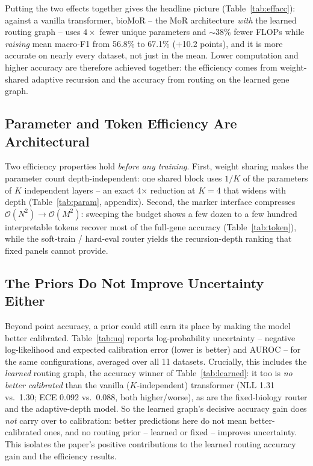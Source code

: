 \documentclass[letterpaper]{article}
\begin{document}
Putting the two effects together gives the headline picture (Table~\ref{tab:effacc}):
against a vanilla transformer, bioMoR -- the MoR architecture \emph{with} the learned
routing graph -- uses $4\times$ fewer unique parameters and
$\sim$38\% fewer FLOPs while \emph{raising} mean macro-F1 from 56.8\% to
67.1\% ($+$10.2 points), and it is more accurate on nearly every dataset,
not just in the mean. Lower computation and higher accuracy are therefore achieved together:
the efficiency comes from weight-shared adaptive recursion and the accuracy from routing on
the learned gene graph.


\subsection{Parameter and Token Efficiency Are Architectural}
\label{sec:params}
Two efficiency properties hold \emph{before any training}. First, weight sharing makes the
parameter count depth-independent: one shared block uses $1/K$ of the parameters of $K$
independent layers -- an exact 4$\times$ reduction at $K{=}$4 that
widens with depth (Table~\ref{tab:param}, appendix). Second, the marker interface compresses
$\mathcal{O}(N^2)\!\to\!\mathcal{O}(M^2)$: sweeping the budget shows a few dozen to a few
hundred interpretable tokens recover most of the full-gene accuracy (Table~\ref{tab:token}),
while the soft-train / hard-eval router yields the recursion-depth ranking that
fixed panels cannot provide.



\subsection{The Priors Do Not Improve Uncertainty Either}
Beyond point accuracy, a prior could still earn its place by making the model better
calibrated. Table~\ref{tab:uq} reports log-probability uncertainty -- negative
log-likelihood and expected calibration error (lower is better) and AUROC -- for the same
configurations, averaged over all 11 datasets. Crucially, this includes the
\emph{learned} routing graph, the accuracy winner of Table~\ref{tab:learned}: it too is
\emph{no better calibrated} than the vanilla ($K$-independent) transformer (NLL
1.31 vs.\ 1.30; ECE 0.092 vs.\ 0.088, both
higher/worse), as are the fixed-biology router and the adaptive-depth model. So the
learned graph's decisive accuracy gain does \emph{not} carry over to calibration: better
predictions here do not mean better-calibrated ones, and no routing prior -- learned or
fixed -- improves uncertainty. This isolates the paper's positive contributions to the
learned routing accuracy gain and the efficiency results.
\end{document}
